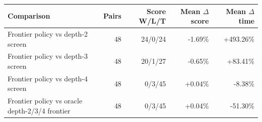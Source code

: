 \begin{tabular}{lrrrr}
\toprule
Comparison & Pairs & Score W/L/T & Mean $\Delta$ score & Mean $\Delta$ time \\
\midrule
Frontier policy vs depth-2 screen & 48 & 24/0/24 & -1.69\% & +493.26\% \\
Frontier policy vs depth-3 screen & 48 & 20/1/27 & -0.65\% & +83.41\% \\
Frontier policy vs depth-4 screen & 48 & 0/3/45 & +0.04\% & -8.38\% \\
Frontier policy vs oracle depth-2/3/4 frontier & 48 & 0/3/45 & +0.04\% & -51.30\% \\
\bottomrule
\end{tabular}

